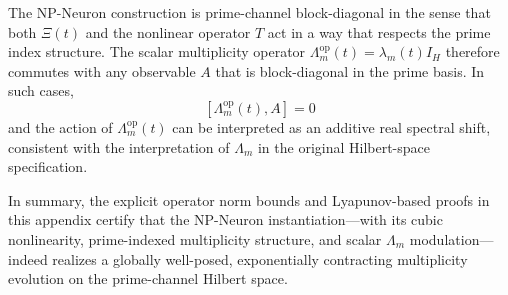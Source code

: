 \documentclass[11pt]{article}
\begin{document}
The NP-Neuron construction is prime-channel block-diagonal in the sense that both \(\Xi(t)\) and the nonlinear operator \(T\) act in a way that respects the prime index structure.
The scalar multiplicity operator \(\Lambda_m^{\mathrm{op}}(t) = \lambda_m(t)I_H\) therefore commutes with any observable \(A\) that is block-diagonal in the prime basis.
In such cases,
\[
[\Lambda_m^{\mathrm{op}}(t), A] = 0
\]
and the action of \(\Lambda_m^{\mathrm{op}}(t)\) can be interpreted as an additive real spectral shift, consistent with the interpretation of \(\Lambda_m\) in the original Hilbert-space specification.

In summary, the explicit operator norm bounds and Lyapunov-based proofs in this appendix certify that the NP-Neuron instantiation—with its cubic nonlinearity, prime-indexed multiplicity structure, and scalar \(\Lambda_m\) modulation—indeed realizes a globally well-posed, exponentially contracting multiplicity evolution on the prime-channel Hilbert space.

\nocite{*}
  
  
\end{document}

